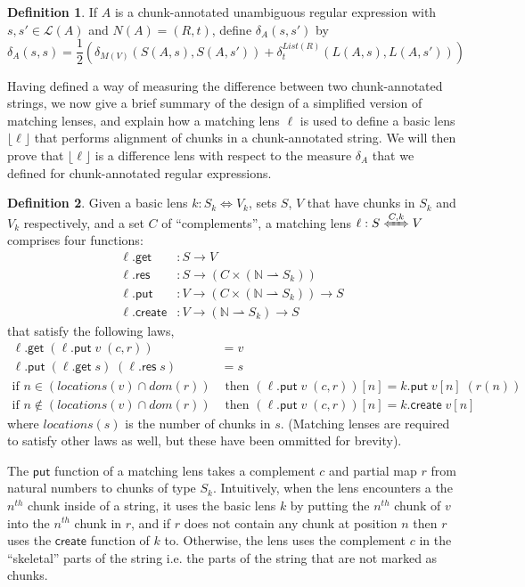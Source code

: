 \documentclass[acmsmall,review,anonymous]{acmart}\settopmatter{printfolios=true,printccs=false,printacmref=false}
\theoremstyle{definition}
\newtheorem{definition}{Definition}
\newcommand{\kw}[1]{\ensuremath{\mathsf{#1}}\xspace}
\newcommand{\get}{\ensuremath{\kw{get}}\xspace}
\newcommand{\pput}{\ensuremath{\kw{put}}\xspace}
\newcommand{\create}{\ensuremath{\kw{create}}\xspace}
\newcommand{\res}{\ensuremath{\kw{res}}\xspace}
\begin{document}
\begin{definition}
If $A$ is a chunk-annotated unambiguous regular expression with $s,s' \in \mathcal{L}(A)$ and $N(A) = (R, t)$, define $\delta_A(s, s')$ by
$$
\delta_A(s, s) = 
\frac{1}{2} \left(\delta_{M(V)}(S(A,s), S(A,s')) + \delta^{List(R)}_{t}(L(A, s), L(A, s'))\right)
$$
\end{definition}
Having defined a way of measuring the difference between two chunk-annotated strings, we now give a brief summary of the design of a simplified version of matching lenses, and explain how a matching lens $\ell$ is used to define a basic lens $\lfloor \ell \rfloor$ that performs alignment of chunks in a chunk-annotated string. We will then prove that $\lfloor \ell \rfloor$ is a difference lens with respect to the measure $\delta_A$ that we defined for chunk-annotated regular expressions.
\begin{definition}
Given a basic lens $k : S_k \Leftrightarrow V_k$, sets $S$, $V$ that have chunks in $S_k$ and $V_k$ respectively, and a set $C$ of ``complements'', a matching lens $\ell : S \xLeftrightarrow{C, k} V$ comprises four functions:
\begin{align*}
\ell.\get &: S \longrightarrow V\\
\ell.\res &: S \longrightarrow (C \times (\mathbb{N} \rightharpoonup S_k))\\
\ell.\pput &: V \longrightarrow (C \times (\mathbb{N} \rightharpoonup S_k)) \longrightarrow S\\
\ell.\create &: V \longrightarrow (\mathbb{N} \rightharpoonup S_k) \longrightarrow S
\end{align*}
that satisfy the following laws,
\begin{align*}
\ell.\get \; (\ell.\pput \; v \; 
(c,r)) &= v \tag{PUTGET}\\
\ell.\pput \; (\ell.\get \; s) \; (\ell.\res \; s) &= s \tag{GETPUT}\\
\text{if } n \in (locations(v) \cap dom(r)) &\text{ then } (\ell.\pput \; v \; (c, r))[n] = k.\pput \; v[n] \; (r(n)) \tag{CHUNKPUT}\\
\text{if } n \not \in (locations(v) \cap dom(r)) &\text{ then } (\ell.\pput \; v \; (c, r))[n] = k.\create \; v[n] \tag{NOCHUNKPUT}
\end{align*}
where $locations(s)$ is the number of chunks in $s$. (Matching lenses are required to satisfy other laws as well, but these have been ommitted for brevity).
\end{definition}
The \pput function of a matching lens takes a complement $c$ and partial map $r$ from natural numbers to chunks of type $S_k$. Intuitively, when the lens encounters a the $n^{th}$ chunk inside of a string, it uses the basic lens $k$ by putting the $n^{th}$ chunk of $v$ into the $n^{th}$ chunk in $r$, and if $r$ does not contain any chunk at position $n$ then $r$ uses the \create function of $k$ to. Otherwise, the lens uses the complement $c$ in the ``skeletal'' parts of the string i.e. the parts of the string that are not marked as chunks.
\end{document}
